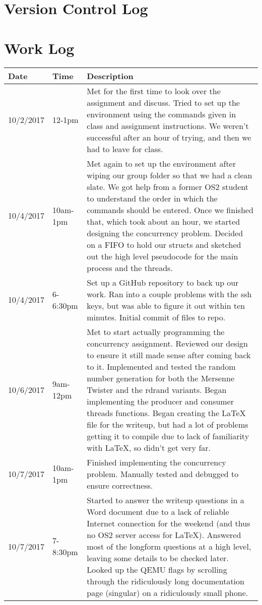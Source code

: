 \documentclass[letterpaper,10pt]{article}
\begin{document}
\section{Version Control Log} 




\section{Work Log}

\begin{tabular}{ |p{2.5cm}|p{2.5cm}|p{9cm}| } 
   \hline
   Date & Time & Description \\
   \hline
   10/2/2017 & 12-1pm & Met for the first time to look over the assignment and discuss. Tried to set up the environment using the commands given in class and assignment instructions. We weren't successful after an hour of trying, and then we had to leave for class.\\
   \hline
   10/4/2017 & 10am-1pm & Met again to set up the environment after wiping our group folder so that we had a clean slate. We got help from a former OS2 student to understand the order in which the commands should be entered. Once we finished that, which took about an hour, we started designing the concurrency problem. Decided on a FIFO to hold our structs and sketched out the high level pseudocode for the main process and the threads.\\
   \hline
   10/4/2017 & 6-6:30pm & Set up a GitHub repository to back up our work. Ran into a couple problems with the ssh keys, but was able to figure it out within ten minutes. Initial commit of files to repo.\\
   \hline
   10/6/2017 & 9am-12pm & Met to start actually programming the concurrency assignment. Reviewed our design to ensure it still made sense after coming back to it. Implemented and tested the random number generation for both the Mersenne Twister and the rdrand variants. Began implementing the producer and consumer threads functions. Began creating the LaTeX file for the writeup, but had a lot of problems getting it to compile due to lack of familiarity with LaTeX, so didn't get very far.\\
   \hline
   10/7/2017 & 10am-1pm & Finished implementing the concurrency problem. Manually tested and debugged to ensure correctness.\\
   \hline
   10/7/2017 & 7-8:30pm & Started to answer the writeup questions in a Word document due to a lack of reliable Internet connection for the weekend (and thus no OS2 server access for LaTeX). Answered most of the longform questions at a high level, leaving some details to be checked later. Looked up the QEMU flags by scrolling through the ridiculously long documentation page (singular) on a ridiculously small phone.\\

\end{tabular}
\end{document}
